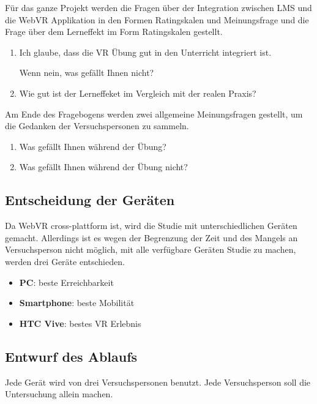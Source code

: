 Für das ganze Projekt werden die Fragen über der Integration zwischen LMS und die WebVR Applikation in den Formen Ratingskalen und Meinungsfrage und die Frage über dem Lerneffekt im Form Ratingskalen gestellt.

\begin{enumerate}
    \item Ich glaube, dass die VR Übung gut in den Unterricht integriert ist.
    
    Wenn nein, was gefällt Ihnen nicht?
    
    \item Wie gut ist der Lerneffeket im Vergleich mit der realen Praxis? 
\end{enumerate}

Am Ende des Fragebogens werden zwei allgemeine Meinungsfragen gestellt, um die Gedanken der Versuchspersonen zu sammeln.

\begin{enumerate}
    \item Was gefällt Ihnen während der Übung?
    
    \item Was gefällt Ihnen während der Übung nicht?
\end{enumerate}

\subsection{Entscheidung der Geräten}

Da WebVR cross-plattform ist, wird die Studie mit unterschiedlichen Geräten gemacht. Allerdings ist es wegen der Begrenzung der Zeit und des Mangels an Versuchsperson nicht möglich, mit alle verfügbare Geräten Studie zu machen, werden drei Geräte entschieden.

\begin{itemize}
    \item \textbf{PC}: beste Erreichbarkeit
    \item \textbf{Smartphone}: beste Mobilität
    \item \textbf{HTC Vive}: bestes VR Erlebnis
\end{itemize}

\subsection{Entwurf des Ablaufs}

Jede Gerät wird von drei Versuchspersonen benutzt. Jede Versuchsperson soll die Untersuchung allein machen.


